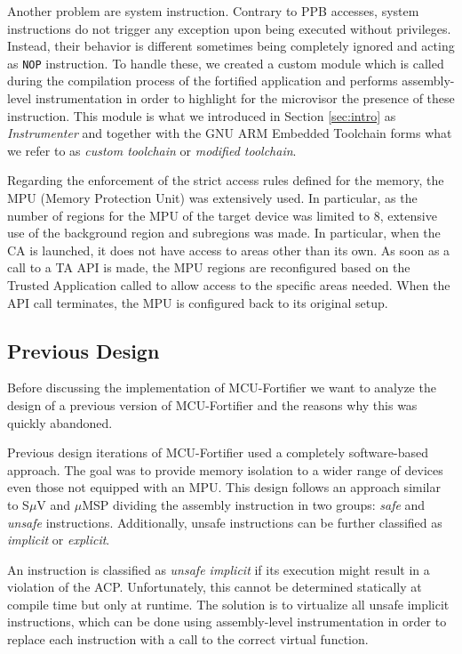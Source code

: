 \documentclass{article}
\begin{document}
Another problem are system instruction. Contrary to PPB accesses, system instructions do not trigger any exception upon being executed without privileges. Instead, their behavior is different sometimes being completely ignored and acting as \verb*|NOP| instruction. To handle these, we created a custom module which is called during the compilation process of the fortified application and performs assembly-level instrumentation in order to highlight for the microvisor the presence of these instruction. This module is what we introduced in Section \ref{sec:intro} as \textit{Instrumenter} and together with the GNU ARM Embedded Toolchain forms what we refer to as \textit{custom toolchain} or \textit{modified toolchain}.

Regarding the enforcement of the strict access rules defined for the memory, the MPU (Memory Protection Unit) was extensively used. In particular, as the number of regions for the MPU of the target device was limited to 8, extensive use of the background region and subregions was made. In particular, when the CA is launched, it does not have access to areas other than its own. As soon as a call to a TA API is made, the MPU regions are reconfigured based on the Trusted Application called to allow access to the specific areas needed. When the API call terminates, the MPU is configured back to its original setup. 

\subsection{Previous Design}
Before discussing the implementation of MCU-Fortifier we want to analyze the design of a previous version of MCU-Fortifier and the reasons why this was quickly abandoned.

Previous design iterations of MCU-Fortifier used a completely software-based approach. The goal was to provide memory isolation to a wider range of devices even those not equipped with an MPU. This design follows an approach similar to S$\mu$V\cite{suv} and $\mu$MSP\cite{msp} dividing the assembly instruction in two groups: \textit{safe} and \textit{unsafe} instructions.
Additionally, unsafe instructions can be further classified as \textit{implicit} or \textit{explicit}.

An instruction is classified as \textit{unsafe implicit} if its execution might result in a violation of the ACP. Unfortunately, this cannot be determined statically at compile time but only at runtime.
The solution is to virtualize all unsafe implicit instructions, which can be done using assembly-level instrumentation in order to replace each instruction with a call to the correct virtual function.
\end{document}

